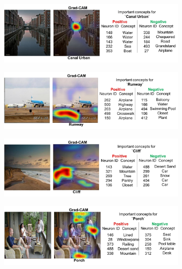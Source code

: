 \begin{figure}[h]
\begin{center}
\begin{subfigure}[t]{\columnwidth}
\includegraphics[scale=0.135]{figures/5_pos.jpg}\caption{}
\vspace{10pt}
\end{subfigure}
\begin{subfigure}[t]{\columnwidth}
\includegraphics[scale=0.135]{figures/6_pos.jpg}\caption{}
\vspace{10pt}
\end{subfigure}
\begin{subfigure}[t]{\columnwidth}
\includegraphics[scale=0.135]{figures/7_pos.jpg}\caption{}
\vspace{10pt}
\end{subfigure}
\begin{subfigure}[t]{\columnwidth}
\includegraphics[scale=0.135]{figures/8_pos.jpg}\caption{}

\end{subfigure}
\end{center}
\end{figure}

